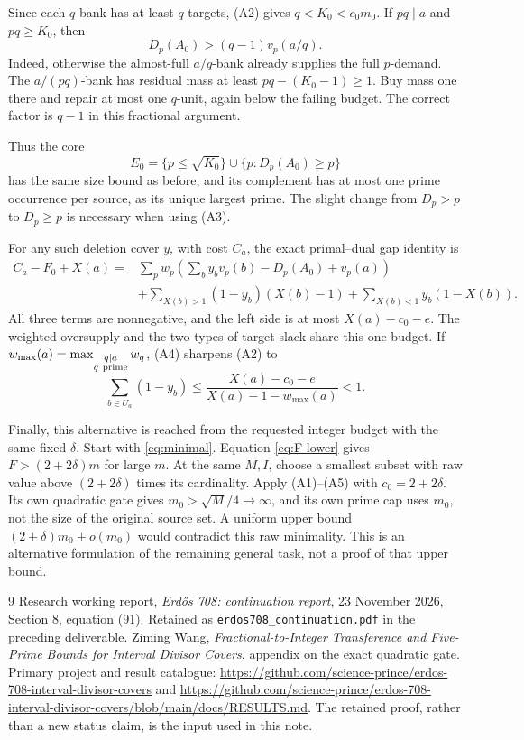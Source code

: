 \documentclass[11pt,a4paper]{article}
\theoremstyle{remark}
\begin{document}
Since each \(q\)-bank has at least \(q\) targets, (A2) gives
\(q<K_0<c_0m_0\). If \(pq\mid a\) and \(pq\ge K_0\), then
\[
 D_p(A_0)>(q-1)v_p(a/q).
 \tag{A3}
\]
Indeed, otherwise the almost-full \(a/q\)-bank already supplies
the full \(p\)-demand. The \(a/(pq)\)-bank has residual mass at
least \(pq-(K_0-1)\ge1\). Buy mass one there and repair at most
one \(q\)-unit, again below the failing budget.
The correct factor is \(q-1\) in this fractional argument.

Thus the core
\[
 E_0=\{p\le\sqrt{K_0}\}\cup\{p:D_p(A_0)\ge p\}
\]
has the same size bound as before, and its complement has
at most one prime occurrence per source, as its unique
largest prime. The slight change from \(D_p>p\) to \(D_p\ge p\)
is necessary when using (A3).

For any such deletion cover \(y\), with cost \(C_a\), the exact
primal--dual gap identity is
\begin{align*}
 C_a-F_0+X(a)
 ={}&\sum_p w_p\left(\sum_by_bv_p(b)-D_p(A_0)+v_p(a)\right)\\
 &+\sum_{X(b)>1}(1-y_b)(X(b)-1)
   +\sum_{X(b)<1}y_b(1-X(b)).
 \tag{A4}
\end{align*}
All three terms are nonnegative, and the left side is at most
\(X(a)-c_0-e\). The weighted oversupply and the two types of
target slack share this one budget. If
\(w_{\max}(a)=\max_{\substack{q\mid a\\q\ {\rm prime}}}w_q\),
(A4) sharpens (A2) to
\[
 \sum_{b\in U_a}(1-y_b)
 \le\frac{X(a)-c_0-e}{X(a)-1-w_{\max}(a)}<1.
 \tag{A5}
\]

Finally, this alternative is reached from the requested integer
budget with the same fixed \(\delta\). Start with
\eqref{eq:minimal}. Equation \eqref{eq:F-lower} gives
 \(F>(2+2\delta)m\) for large \(m\).
At the same \(M,I\), choose a smallest subset with raw value
above \((2+2\delta)\) times its cardinality. Apply (A1)--(A5)
with \(c_0=2+2\delta\). Its own quadratic gate gives
\(m_0>\sqrt M/4\to\infty\), and its own prime cap uses \(m_0\),
not the size of the original source set.
A uniform upper bound \((2+\delta)m_0+o(m_0)\) would contradict
this raw minimality. This is an alternative formulation of the
remaining general task, not a proof of that upper bound.

\begin{thebibliography}{9}
Research working report,
\emph{Erd\H{o}s 708: continuation report}, 23 November 2026,
Section 8, equation (91). Retained as
\nolinkurl{erdos708_continuation.pdf} in the preceding deliverable.
Ziming Wang,
\emph{Fractional-to-Integer Transference and Five-Prime Bounds
for Interval Divisor Covers}, appendix on the exact quadratic gate.
Primary project and result catalogue:
\url{https://github.com/science-prince/erdos-708-interval-divisor-covers}
and
\url{https://github.com/science-prince/erdos-708-interval-divisor-covers/blob/main/docs/RESULTS.md}.
The retained proof, rather than a new status claim, is the input
used in this note.
\end{thebibliography}
\end{document}
